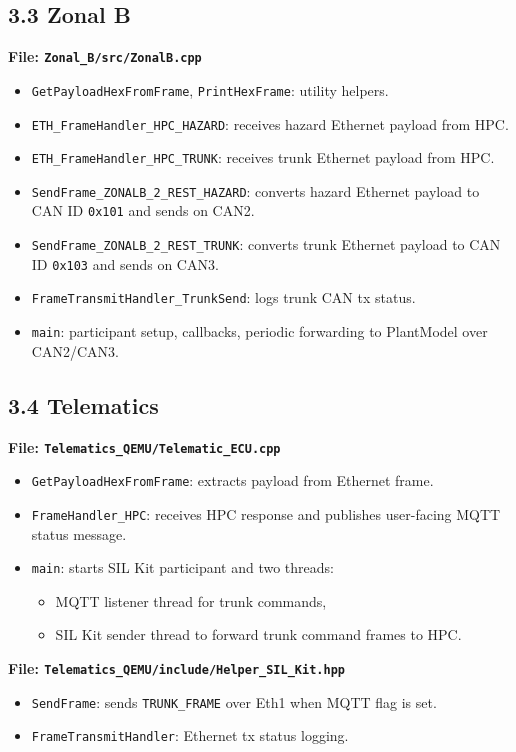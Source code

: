 \documentclass[11pt,a4paper]{article}
\begin{document}
\subsection*{3.3 Zonal B}
\textbf{File: \texttt{Zonal\_B/src/ZonalB.cpp}}
\begin{itemize}
  \item \texttt{GetPayloadHexFromFrame}, \texttt{PrintHexFrame}: utility helpers.
  \item \texttt{ETH\_FrameHandler\_HPC\_HAZARD}: receives hazard Ethernet payload from HPC.
  \item \texttt{ETH\_FrameHandler\_HPC\_TRUNK}: receives trunk Ethernet payload from HPC.
  \item \texttt{SendFrame\_ZONALB\_2\_REST\_HAZARD}: converts hazard Ethernet payload to CAN ID \texttt{0x101} and sends on CAN2.
  \item \texttt{SendFrame\_ZONALB\_2\_REST\_TRUNK}: converts trunk Ethernet payload to CAN ID \texttt{0x103} and sends on CAN3.
  \item \texttt{FrameTransmitHandler\_TrunkSend}: logs trunk CAN tx status.
  \item \texttt{main}: participant setup, callbacks, periodic forwarding to PlantModel over CAN2/CAN3.
\end{itemize}

\subsection*{3.4 Telematics}
\textbf{File: \texttt{Telematics\_QEMU/Telematic\_ECU.cpp}}
\begin{itemize}
  \item \texttt{GetPayloadHexFromFrame}: extracts payload from Ethernet frame.
  \item \texttt{FrameHandler\_HPC}: receives HPC response and publishes user-facing MQTT status message.
  \item \texttt{main}: starts SIL Kit participant and two threads:
  \begin{itemize}
    \item MQTT listener thread for trunk commands,
    \item SIL Kit sender thread to forward trunk command frames to HPC.
  \end{itemize}
\end{itemize}

\textbf{File: \texttt{Telematics\_QEMU/include/Helper\_SIL\_Kit.hpp}}
\begin{itemize}
  \item \texttt{SendFrame}: sends \texttt{TRUNK\_FRAME} over Eth1 when MQTT flag is set.
  \item \texttt{FrameTransmitHandler}: Ethernet tx status logging.
\end{itemize}
\end{document}
